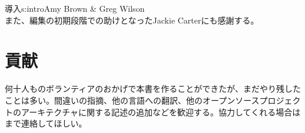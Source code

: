 \begin{aosachapter}{導入}{s:intro}{Amy Brown \& Greg Wilson}
~\\

\noindent また、編集の初期段階での助けとなったJackie Carterにも感謝する。

\section*{貢献}

何十人ものボランティアのおかげで本書を作ることができたが、まだやり残したことは多い。間違いの指摘、他の言語への翻訳、他のオープンソースプロジェクトのアーキテクチャに関する記述の追加などを歓迎する。協力してくれる場合はまで連絡してほしい。

\end{aosachapter}
